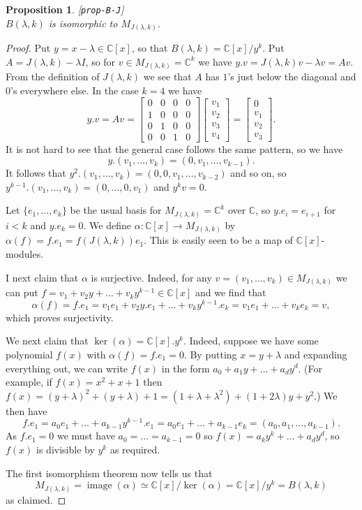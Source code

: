 \documentclass{amsart}
\newcommand{\lbl}[1]{\label{#1}\textup{[\texttt{#1}]}\ \\}
\newcommand{\lbl}{\label}
\newcommand{\bbm}       {\left[\begin{matrix}}
\newcommand{\ebm}       {\end{matrix}\right]}
\newcommand{\img}       {\operatorname{image}}
\newcommand{\C}         {{\mathbb{C}}}
\newcommand{\al}        {\alpha}
\newcommand{\lm}        {\lambda}
\newcommand{\xra}       {\xrightarrow}
\renewcommand{\:}{\colon}
\newtheorem{proposition}[theorem]{Proposition}
\theoremstyle{definition}
\begin{document}
\begin{proposition}\lbl{prop-B-J}
 $B(\lm,k)$ is isomorphic to $M_{J(\lm,k)}$.
\end{proposition}
\begin{proof}
 Put $y=x-\lm\in\C[x]$, so that $B(\lm,k)=\C[x]/y^k$.  Put
 $A=J(\lm,k)-\lm I$, so for $v\in M_{J(\lm,k)}=\C^k$ we have
 $y.v=J(\lm,k)v-\lm v=Av$.  From the definition of $J(\lm,k)$ we see
 that $A$ has $1$'s just below the diagonal and $0$'s everywhere
 else.  In the case $k=4$ we have
 \[ y.v = Av =
         \bbm 0&0&0&0 \\ 1&0&0&0 \\ 0&1&0&0 \\ 0&0&1&0 \ebm
         \bbm v_1 \\ v_2 \\ v_3 \\ v_4 \ebm =
         \bbm 0   \\ v_1 \\ v_2 \\ v_3 \ebm.
 \] 
 It is not hard to see that the general case follows the same pattern,
 so we have 
 \[ y.(v_1,\ldots,v_k)=(0,v_1,\ldots,v_{k-1}). \] 
 It follows that $y^2.(v_1,\ldots,v_k)=(0,0,v_1,\ldots,v_{k-2})$ and
 so on, so $y^{k-1}.(v_1,\ldots,v_k)=(0,\ldots,0,v_1)$ and $y^kv=0$.

 Let $\{e_1,\ldots,e_k\}$ be the usual basis for $M_{J(\lm,k)}=\C^k$
 over $\C$, so $y.e_i=e_{i+1}$ for $i<k$ and $y.e_k=0$.  We define
 $\al\:\C[x]\xra{}M_{J(\lm,k)}$ by $\al(f)=f.e_1=f(J(\lm,k))e_1$.
 This is easily seen to be a map of $\C[x]$-modules.

 I next claim that $\al$ is surjective.  Indeed, for any
 $v=(v_1,\ldots,v_k)\in M_{J(\lm,k)}$ we can put
 $f=v_1+v_2y+\ldots+v_ky^{k-1}\in\C[x]$ and we find that 
 \[ \al(f)=f.e_1=v_1e_1+v_2y.e_1+\ldots+v_ky^{k-1}.e_k =
     v_1e_1+\ldots+v_ke_k = v,
 \]
 which proves surjectivity.

 We next claim that $\ker(\al)=\C[x].y^k$.  Indeed, suppose we have
 some polynomial $f(x)$ with $\al(f)=f.e_1=0$.  By putting $x=y+\lm$
 and expanding everything out, we can write $f(x)$ in the form
 $a_0+a_1y+\ldots+a_dy^d$.  (For example, if $f(x)=x^2+x+1$ then
 $f(x)=(y+\lm)^2+(y+\lm)+1=(1+\lm+\lm^2)+(1+2\lm)y+y^2$.)  We then
 have 
 \[ f.e_1 = a_0e_1+\ldots+a_{k-1}y^{k-1}.e_1 = 
            a_0e_1+\ldots+a_{k-1}e_k = 
            (a_0,a_1,\ldots,a_{k-1}).
 \]
 As $f.e_1=0$ we must have $a_0=\ldots=a_{k-1}=0$ so
 $f(x)=a_ky^k+\ldots+a_dy^d$, so $f(x)$ is divisible by $y^k$ as
 required.

 The first isomorphism theorem now tells us that
 \[ M_{J(\lm,k)}=\img(\al)\simeq \C[x]/\ker(\al)=\C[x]/y^k=B(\lm,k) \]
 as claimed.
\end{proof}
\end{document}

